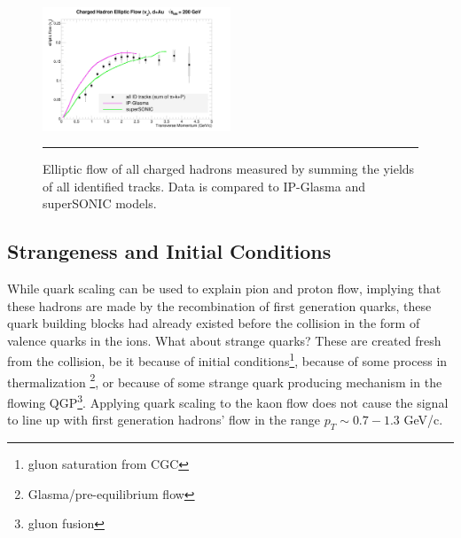 \begin{figure}[hbtp]
\centering    
    \includegraphics[width=0.5\textwidth]{results/v2hydro.jpg}
    \rule{35em}{0.5pt}
    \caption[Elliptic flow of all charged hadrons compared to hydrodynamic models.]{Elliptic flow of all charged hadrons measured by summing the yields of all identified tracks. Data is compared to IP-Glasma and superSONIC models.}
    \label{fig:allhadronhydro}
\end{figure}

\subsection{Strangeness and Initial Conditions}
While quark scaling can be used to explain pion and proton flow, implying that these hadrons are made by the recombination of first generation quarks, these quark building blocks had already existed before the collision in the form of valence quarks in the ions. What about strange quarks? These are created fresh from the collision, be it because of initial conditions\footnote{gluon saturation from CGC}, because of some process in thermalization \footnote{Glasma/pre-equilibrium flow}, or because of some strange quark producing mechanism in the flowing QGP\footnote{gluon fusion}. Applying quark scaling to the kaon flow does not cause the signal to line up with first generation hadrons' flow in the range $p_T \sim 0.7-1.3$ GeV/c.

